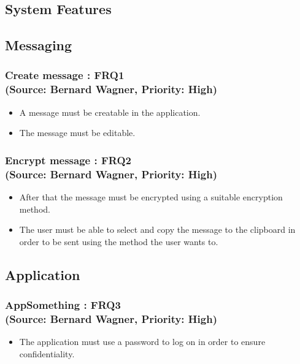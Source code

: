 \subsection{System Features}

\vspace{12pt}


\subsection*{\Large{\textbf{Messaging}}}
\normalsize
\vspace{12pt}


\subsubsection*{Create message : FRQ1\\(Source: Bernard Wagner, Priority: High)}%
\begin{itemize}
\item A message must be creatable in the application.
\item The message must be editable.
\end{itemize}

\subsubsection*{Encrypt message : FRQ2\\(Source: Bernard Wagner, Priority: High)}
\begin{itemize}
\item After that the message must be encrypted using a suitable encryption method.
\item The user must be able to select and copy the message to the clipboard in order to be sent using the method the user wants to.
\end{itemize}


\subsection*{\Large{\textbf{Application}}}


\subsubsection*{AppSomething : FRQ3\\(Source: Bernard Wagner, Priority: High)}%
\begin{itemize}
\item The application must use a password to log on in order to ensure confidentiality.
\end{itemize}


